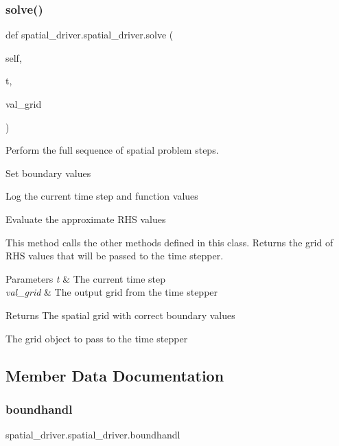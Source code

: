 \subsubsection{\texorpdfstring{solve()}{solve()}}
{\footnotesize\ttfamily def spatial\+\_\+driver.\+spatial\+\_\+driver.\+solve (\begin{DoxyParamCaption}\item[{}]{self,  }\item[{}]{t,  }\item[{}]{val\+\_\+grid }\end{DoxyParamCaption})}



Perform the full sequence of spatial problem steps. 


\begin{DoxyEnumerate}
\item Set boundary values
\item Log the current time step and function values
\item Evaluate the approximate R\+HS values
\end{DoxyEnumerate}

This method calls the other methods defined in this class. Returns the grid of R\+HS values that will be passed to the time stepper. 
\begin{DoxyParams}{Parameters}
{\em t} & The current time step \\
\hline
{\em val\+\_\+grid} & The output grid from the time stepper \\
\hline
\end{DoxyParams}
\begin{DoxyReturn}{Returns}
The spatial grid with correct boundary values 

The grid object to pass to the time stepper 
\end{DoxyReturn}


\subsection{Member Data Documentation}
\mbox{\label{classspatial__driver_1_1spatial__driver_aeb66b87c7c18067c8a9a16b47bcbbd2f}} 
\subsubsection{\texorpdfstring{boundhandl}{boundhandl}}
{\footnotesize\ttfamily spatial\+\_\+driver.\+spatial\+\_\+driver.\+boundhandl}




